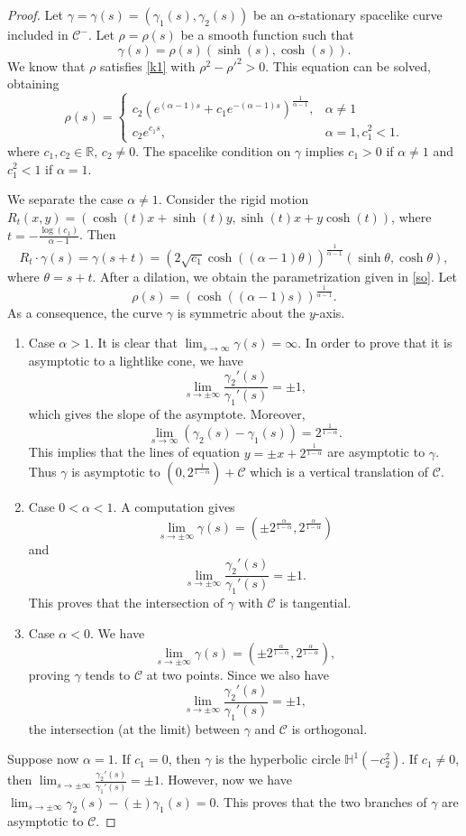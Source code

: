 \documentclass[10pt,a4paper]{amsart}
\def\h{\mathbb H}
\def\r{\mathbb R}
\begin{document}
\begin{proof}
Let $\gamma=\gamma(s)=(\gamma_1(s),\gamma_2(s))$ be an $\alpha$-stationary spacelike curve   included in $\mathcal{C}^-$. Let $\rho=\rho(s)$ be a smooth function such that  
$$\gamma(s)=\rho(s)(\sinh(s), \cosh(s)).$$
We know that $\rho$ satisfies \eqref{k1} with  $\rho^2-\rho'^2>0$. This equation   can be solved,  obtaining
$$\rho(s)= \left\{\begin{array}{ll}
c_2 \left(e^{(\alpha-1)s}+c_1 e^{-(\alpha-1)s}\right)^\frac{1}{\alpha-1},&\alpha\not=1\\
c_2e^{c_1 s},&\alpha=1, c_1^2<1.
\end{array}\right.
$$
where $c_1,c_2\in\r$, $c_2\not=0$. The spacelike condition on $\gamma$ implies  $c_1>0$ if $\alpha\not=1$ and $c_1^2<1$ if $\alpha=1$.  

We separate the case $\alpha\not=1$. Consider the rigid motion $R_t(x,y)= (\cosh(t) x+\sinh(t) y,\sinh(t)x+y\cosh(t))$, where $t=-\frac{\log(c_1)}{\alpha-1}$. Then 
$$R_t\cdot \gamma(s)=\gamma(s+t)=(2\sqrt{c_1}\cosh((\alpha-1)\theta))^\frac{1}{\alpha-1}(\sinh\theta,\cosh\theta),$$
where $\theta=s+t$. After a dilation, we obtain the parametrization given in \eqref{so}. Let 
$$\rho(s)=(\cosh((\alpha-1)s))^\frac{1}{\alpha-1}.$$
As a consequence, the curve $\gamma$ is symmetric about the $y$-axis.
\begin{enumerate}
\item Case $\alpha>1$. It is clear that $\lim_{s\to\infty}\gamma(s)=\infty$. In order to prove that it is asymptotic to a lightlike cone, we have
$$\lim_{s\to\pm\infty}\frac{\gamma_2'(s)}{\gamma_1'(s)}=\pm 1,$$
which gives the slope of the asymptote. Moreover, 
$$\lim_{s\to\infty}(\gamma_2(s)-\gamma_1(s))=2^\frac{1}{1-\alpha}.$$
This implies that the lines of equation $y=\pm  x+2^\frac{1}{1-\alpha}$ are asymptotic to $\gamma$. Thus $\gamma$ is asymptotic to $(0,2^{\frac{1}{1-\alpha}})+\mathcal{C}$ which is a vertical translation of $\mathcal{C}$.
\item Case $0<\alpha<1$. A computation gives 
$$\lim_{s\to\pm\infty}\gamma(s)=(\pm 2^\frac{\alpha}{1-\alpha},2^\frac{\alpha}{1-\alpha})$$
and
$$\lim_{s\to\pm\infty}\frac{\gamma_2'(s)}{\gamma_1'(s)}=\pm 1.$$
This proves that the intersection of $\gamma$ with  $\mathcal{C}$ is tangential.
\item Case $\alpha<0$. We have 
$$\lim_{s\to\pm\infty}\gamma(s)=(\pm 2^\frac{\alpha}{1-\alpha},2^\frac{\alpha}{1-\alpha}),$$
proving $\gamma$ tends to $\mathcal{C}$ at two points. Since we also have
$$\lim_{s\to\pm\infty}\frac{\gamma_2'(s)}{\gamma_1'(s)}=\pm 1,$$
the intersection (at the limit) between $\gamma$ and $\mathcal{C}$ is orthogonal.
\end{enumerate}
Suppose now $\alpha=1$. If $c_1=0$, then   $\gamma$ is the hyperbolic circle $\h^1(-c_2^2)$.  If $c_1\not=0$, then $\lim_{s\to\pm\infty}\frac{\gamma_2'(s)}{\gamma_1'(s)}=\pm 1$. However, now we have $\lim_{s\to\pm\infty}\gamma_2(s)-(\pm)\gamma_1(s)=0$. This proves that the two branches of $\gamma$ are asymptotic to $\mathcal{C}$.

\end{proof}
\end{document}
